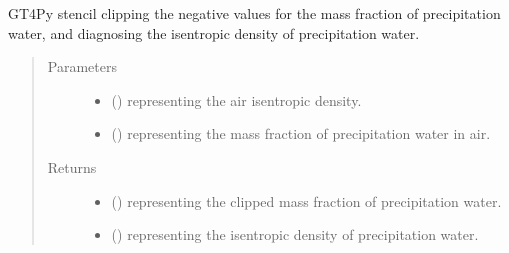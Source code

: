 \documentclass[letterpaper,10pt,english]{sphinxmanual}
\begin{document}
\begin{fulllineitems}
\begin{fulllineitems}
\end{fulllineitems}


\begin{fulllineitems}
\label{\detokenize{api:dycore.prognostic_isentropic_nonconservative_centered.PrognosticIsentropicNonconservativeCentered._stencil_clipping_mass_fraction_and_diagnosing_isentropic_density_of_precipitation_water_defs}}
GT4Py stencil clipping the negative values for the mass fraction of precipitation water,
and diagnosing the isentropic density of precipitation water.
\begin{quote}\begin{description}
\item[{Parameters}] \leavevmode\begin{itemize}
\item {} 
 () \textendash{}  representing the air isentropic density.

\item {} 
 () \textendash{}  representing the mass fraction of precipitation water in air.

\end{itemize}

\item[{Returns}] \leavevmode
\begin{itemize}
\item {} 
 () \textendash{}  representing the clipped mass fraction of precipitation water.

\item {} 
 () \textendash{}  representing the isentropic density of precipitation water.

\end{itemize}


\end{description}\end{quote}


\end{fulllineitems}
\end{fulllineitems}
\end{document}
